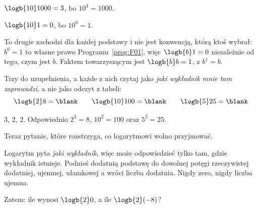 \begin{fr}
\begin{ansblock}
$\logb{10} 1000 = 3$, bo $10^{3} = 1000$.

$\logb{10} 1 = 0$, bo $10^{0} = 1$.
\end{ansblock}

To drugie zachodzi dla każdej podstawy i nie jest konwencją, którą ktoś wybrał:
$b^{0} = 1$ to własne prawo Programu~\ref{prog:F01}, więc $\logb{b} 1 = 0$
niezależnie od tego, czym jest $b$. Faktem towarzyszącym jest
$\logb{b} b = 1$, z $b^{1} = b$.

Trzy do uzupełnienia, a każde z nich czytaj jako \emph{jaki wykładnik mnie tam
zaprowadzi}, a nie jako odczyt z tabeli:
\[ \logb{2} 8 = \blank \qquad \logb{10} 100 = \blank \qquad
   \logb{5} 25 = \blank \]
\dotline
\nextframe
\end{fr}

\begin{fr}
\begin{ansblock}
$3$, \quad $2$, \quad $2$. \quad Odpowiednio $2^{3} = 8$, $10^{2} = 100$ oraz
$5^{2} = 25$.
\end{ansblock}

Teraz pytanie, które rozstrzyga, co logarytmowi wolno przyjmować.

Logarytm pyta \emph{jaki wykładnik}, więc może odpowiedzieć tylko tam, gdzie
wykładnik istnieje. Podnieś dodatnią podstawę do dowolnej potęgi rzeczywistej
\dash{} dodatniej, ujemnej, ułamkowej \dash{} a wróci liczba dodatnia. Nigdy
zero, nigdy liczba ujemna.

Zatem: ile wynosi $\logb{2} 0$, a ile $\logb{2}(-8)$?
\nextframe
\end{fr}

